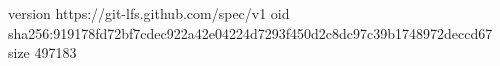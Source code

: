 version https://git-lfs.github.com/spec/v1
oid sha256:919178fd72bf7cdec922a42e04224d7293f450d2c8dc97c39b1748972deccd67
size 497183
